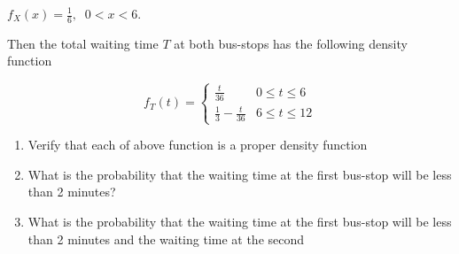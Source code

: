 \documentclass[]{book}
\providecommand{\tightlist}{%
  \setlength{\itemsep}{0pt}\setlength{\parskip}{0pt}}
\begin{document}
\(f_X(x) = \frac{1}{6}, \;\;0<x<6.\)

Then the total waiting time \(T\) at both bus-stops has the following density function

\begin{equation}
f_T(t) =
\begin{cases} 
\frac{t}{36} & 0\leq t \leq 6\\
\frac{1}{3}- \frac{t}{36} & 6\leq t \leq 12
\end{cases}
\end{equation}

\begin{enumerate}
\def\labelenumi{\alph{enumi})}
\tightlist
\item
  Verify that each of above function is a proper density function
\item
  What is the probability that the waiting time at the first bus-stop will be less than 2 minutes?
\item
  What is the probability that the waiting time at the first bus-stop will be less than 2 minutes and the waiting time at the second
\end{enumerate}
\end{document}
